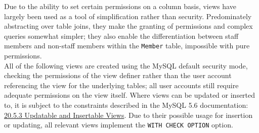 \documentclass[a4paper, titlepage]{article}
\begin{document}
Due to the ability to set certain permissions on a column basis, views have largely been used as a tool of simplification rather than security. Predominately abstracting over table joins, they make the granting of permissions and complex queries somewhat simpler; they also enable the differentiation between staff members and non-staff members within the \texttt{Member} table, impossible with pure permissions. 
\\
All of the following views are created using the MySQL default security mode, checking the permissions of the view definer rather than the user account referencing the view for the underlying tables; all user accounts still require adequate permissions on the view itself. Where views can be updated or inserted to, it is subject to the constraints described in the MySQL 5.6 documentation: \href{https://dev.mysql.com/doc/refman/5.6/en/view-updatability.html}{20.5.3 Updatable and Insertable Views}. Due to their possible usage for insertion or updating, all relevant views implement the \texttt{WITH CHECK OPTION} option.
\end{document}
